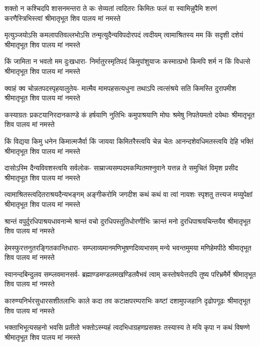 \fourlineindentedshloka
{शक्तो न कश्चिदपि शासनमन्तरा ते}
{कः सेव्यतां त्वदितरः किमितः फलं वा}
{स्वामिन्नुपैमि शरणं करणैस्त्रिभिस्त्वां}
{श्रीमातृभूत शिव पालय मां नमस्ते} %

\fourlineindentedshloka
{मृत्युञ्जयोऽसि कमलापतिवल्लभोऽसि}
{तन्मृत्युदैन्यविपदोरपदं त्वदीयम्}
{त्वामाश्रितस्य मम किं सदृशी दशेयं}
{श्रीमातृभूत शिव पालय मां नमस्ते} %

\fourlineindentedshloka
{किं जामिता न भवतो मम दुःखधारा-}
{निर्मातुरस्मृतिपदं किमुपांशुयाजः}
{कस्मात्प्रभो किमपि शर्म न किं विधत्से}
{श्रीमातृभूत शिव पालय मां नमस्ते} %

\fourlineindentedshloka
{क्वाहं क्व चोन्नतपदस्पृहयालुतेय-}
{मात्मैव मामपहसत्यधुना तथाऽपि}
{त्वत्संश्रये सति किमस्ति दुरापमीश}
{श्रीमातृभूत शिव पालय मां नमस्ते} %

\fourlineindentedshloka
{कस्याग्रतः प्रकटयानिरदानकाण्डे}
{कं हर्षयाणि नुतिभिः कमुपाश्रयाणि}
{मोघः श्रमेषु निपतेयमतो दयेथाः}
{श्रीमातृभूत शिव पालय मां नमस्ते} %

\fourlineindentedshloka
{किं विद्यया किमु धनेन किमात्मजैर्वा}
{किं जायया किमितरैस्त्वयि चेन्न चेतः}
{आनन्दशेवधिमतस्त्वयि देहि भक्तिं}
{श्रीमातृभूत शिव पालय मां नमस्ते} %

\fourlineindentedshloka
{दासोऽस्मि दैन्यविवशस्त्वयि सर्वलोक-}
{साम्राज्यसम्पदमकम्पितमश्नुवाने}
{यत्तन्न ते समुचितं विमृश प्रसीद}
{श्रीमातृभूत शिव पालय मां नमस्ते} %

\fourlineindentedshloka
{त्वामाश्रितस्त्वदितराश्रयदैन्यभङ्गम्}
{अङ्गीकरोमि जगदीश कथं कथं वा}
{त्वां नायशः स्पृशतु तत्त्यज मय्युपेक्षां}
{श्रीमातृभूत शिव पालय मां नमस्ते} %

\fourlineindentedshloka
{श्रान्तं वपुर्दुरधिपाश्रयधावनान्मे}
{श्रान्तं वचो दुरधिपस्तुतिधोरणीभिः}
{क्रान्तं मनो दुरधिपाश्रयचिन्तयैव}
{श्रीमातृभूत शिव पालय मां नमस्ते} %

\fourlineindentedshloka
{हेमस्फुरत्तनुतरङ्गितकान्तिधारा-}
{सम्प्लाव्यमानमणिभूषणदिव्यभासम्}
{मन्ये भवन्तमुमया मणिहेमपीठे}
{श्रीमातृभूत शिव पालय मां नमस्ते} %

\fourlineindentedshloka
{स्वानन्दबिन्दुलव सम्प्लवमानसर्व-}
{ब्रह्माण्डमण्डलमखण्डितवैभवं त्वाम्}
{कस्तोषयेत्तदपि तुष्य परिभ्रमैर्मे}
{श्रीमातृभूत शिव पालय मां नमस्ते} %

\fourlineindentedshloka
{कारुण्यनिर्भरसुधारसशीतलाभिः}
{काले कदा तव कटाक्षपरम्पराभिः}
{कष्टां दशामुपजहानि दृढोपगूढः}
{श्रीमातृभूत शिव पालय मां नमस्ते} %

\fourlineindentedshloka
{भक्ताभिभूत्यसहनो भवसि प्रतीतो}
{भक्तोऽस्म्यहं त्वदभिधाग्रहणप्रसक्तः}
{तस्यास्य ते मयि कृपा न कथं विषण्णे}
{श्रीमातृभूत शिव पालय मां नमस्ते} %

